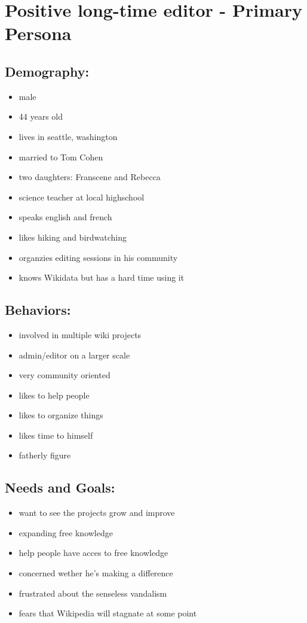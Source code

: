 \documentclass{article}
\date{11.11.2015}
\begin{document}
\section{Positive long-time editor - Primary Persona}

\subsection{Demography:}
\begin{itemize}
 \item male
 \item 44 years old
 \item lives in seattle, washington
 \item married to Tom Cohen
 \item two daughters: Franscene and Rebecca
 \item science teacher at local highschool
 \item speaks english and french
 \item likes hiking and birdwatching
 \item organzies editing sessions in his community
 \item knows Wikidata but has a hard time using it
\end{itemize}

\subsection{Behaviors:}
\begin{itemize}
\item involved in multiple wiki projects
\item admin/editor on a larger scale
\item very community oriented
\item likes to help people
\item likes to organize things
\item likes time to himself
\item fatherly figure
\end{itemize}

\subsection{Needs and Goals:}
\begin{itemize}
 \item want to see the projects grow and improve 
 \item expanding free knowledge
 \item help people have acces to free knowledge
 \item concerned wether he's making a difference
 \item frustrated about the senseless vandalism 
 \item fears that Wikipedia will stagnate at some point
\end{itemize}
\end{document}
